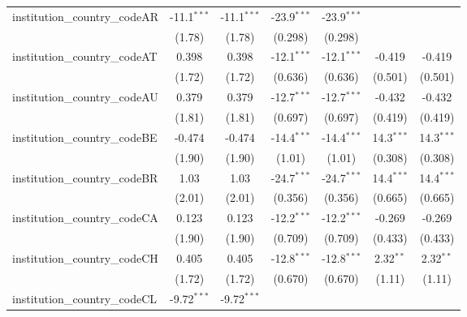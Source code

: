 \begin{tabular}{lcccccc}
   institution\_country\_codeAR          & -11.1$^{***}$ & -11.1$^{***}$ & -23.9$^{***}$ & -23.9$^{***}$ &               &   \\   
                                         & (1.78)        & (1.78)        & (0.298)       & (0.298)       &               &   \\   
   institution\_country\_codeAT          & 0.398         & 0.398         & -12.1$^{***}$ & -12.1$^{***}$ & -0.419        & -0.419\\   
                                         & (1.72)        & (1.72)        & (0.636)       & (0.636)       & (0.501)       & (0.501)\\   
   institution\_country\_codeAU          & 0.379         & 0.379         & -12.7$^{***}$ & -12.7$^{***}$ & -0.432        & -0.432\\   
                                         & (1.81)        & (1.81)        & (0.697)       & (0.697)       & (0.419)       & (0.419)\\   
   institution\_country\_codeBE          & -0.474        & -0.474        & -14.4$^{***}$ & -14.4$^{***}$ & 14.3$^{***}$  & 14.3$^{***}$\\   
                                         & (1.90)        & (1.90)        & (1.01)        & (1.01)        & (0.308)       & (0.308)\\   
   institution\_country\_codeBR          & 1.03          & 1.03          & -24.7$^{***}$ & -24.7$^{***}$ & 14.4$^{***}$  & 14.4$^{***}$\\   
                                         & (2.01)        & (2.01)        & (0.356)       & (0.356)       & (0.665)       & (0.665)\\   
   institution\_country\_codeCA          & 0.123         & 0.123         & -12.2$^{***}$ & -12.2$^{***}$ & -0.269        & -0.269\\   
                                         & (1.90)        & (1.90)        & (0.709)       & (0.709)       & (0.433)       & (0.433)\\   
   institution\_country\_codeCH          & 0.405         & 0.405         & -12.8$^{***}$ & -12.8$^{***}$ & 2.32$^{**}$   & 2.32$^{**}$\\   
                                         & (1.72)        & (1.72)        & (0.670)       & (0.670)       & (1.11)        & (1.11)\\   
   institution\_country\_codeCL          & -9.72$^{***}$ & -9.72$^{***}$ &               &               &               &   \\   

\end{tabular}
